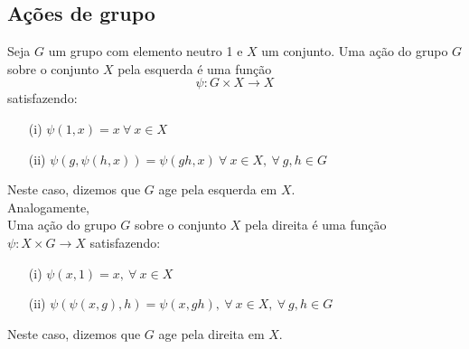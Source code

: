 \subsection{Ações de grupo}
\label{ações-de-grupo-def}


\begin{defi}
	Seja $G$ um grupo com elemento neutro 1 e $X$ um conjunto. Uma ação do grupo $G$ sobre o conjunto $X$ pela esquerda é uma função
 \[\psi: G\times X \longrightarrow X\] satisfazendo:
 
 \begin{itemize}
     \item[(i)] $\psi(1,x) = x \  \forall\  x \in X$
     \item[(ii)] $\psi(g,\psi(h,x)) = \psi(gh,x) \ \forall\ x \in X,\ \forall\ g,h \in G$
 \end{itemize}
 Neste caso, dizemos que $G$ age pela esquerda em $X$.\\
 
\noindent Analogamente,\\
 Uma ação do grupo $G$ sobre o conjunto $X$ pela direita é uma função\\
 $\psi: X\times G \longrightarrow X$ satisfazendo:
 
 \begin{itemize}
     \item[(i)] $\psi(x,1) = x ,\  \forall\  x \in X$
     \item[(ii)] $\psi(\psi(x,g), h) = \psi(x,gh), \ \forall\ x \in X,\ \forall\ g,h \in G$
 \end{itemize}
 Neste caso, dizemos que $G$ age pela direita em $X$.

\end{defi}

